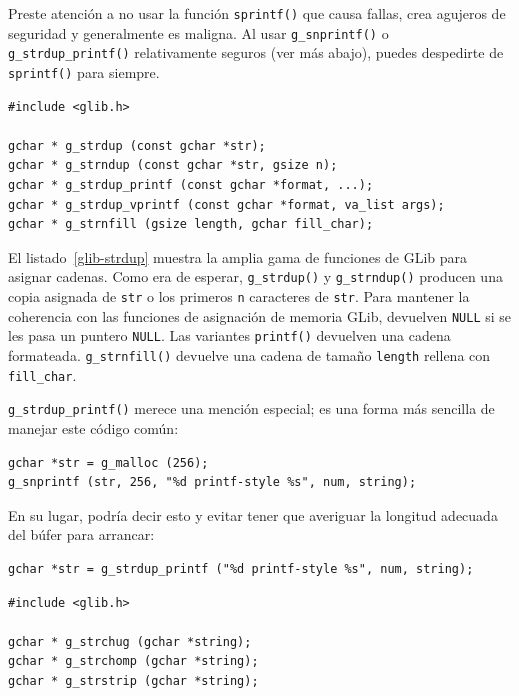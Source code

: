 Preste atención a no usar la función \lstinline{sprintf()} que causa fallas, crea agujeros de seguridad y generalmente es maligna. Al usar \lstinline{g_snprintf()} o \lstinline{g_strdup_printf()} relativamente seguros (ver más abajo), puedes despedirte de \lstinline{sprintf()} para siempre.

\begin{lstlisting}[style=GLib/GTK, caption={Asignar cadenas}, label=glib-strdup]
#include <glib.h>

gchar * g_strdup (const gchar *str);
gchar * g_strndup (const gchar *str, gsize n);
gchar * g_strdup_printf (const gchar *format, ...);
gchar * g_strdup_vprintf (const gchar *format, va_list args);
gchar * g_strnfill (gsize length, gchar fill_char);
\end{lstlisting}

El listado~\ref{glib-strdup} muestra la amplia gama de funciones de GLib para asignar cadenas. Como era de esperar, \lstinline{g_strdup()} y \lstinline{g_strndup()} producen una copia asignada de \lstinline{str} o los primeros \lstinline{n} caracteres de \lstinline{str}. Para mantener la coherencia con las funciones de asignación de memoria GLib, devuelven \lstinline{NULL} si se les pasa un puntero \lstinline{NULL}. Las variantes \lstinline{printf()} devuelven una cadena formateada. \lstinline{g_strnfill()} devuelve una cadena de tamaño \lstinline{length} rellena con \lstinline{fill_char}.

\lstinline{g_strdup_printf()} merece una mención especial; es una forma más sencilla de manejar este código común:
\begin{lstlisting}[style=GLib/GTK,]
gchar *str = g_malloc (256);
g_snprintf (str, 256, "%d printf-style %s", num, string);
\end{lstlisting}

En su lugar, podría decir esto y evitar tener que averiguar la longitud adecuada del búfer para arrancar:
\begin{lstlisting}[style=GLib/GTK,]
gchar *str = g_strdup_printf ("%d printf-style %s", num, string);
\end{lstlisting}

\begin{lstlisting}[style=GLib/GTK, caption={Modificaciones de cadenas in situ}, label=glib-strmanip]
#include <glib.h>

gchar * g_strchug (gchar *string);
gchar * g_strchomp (gchar *string);
gchar * g_strstrip (gchar *string);
\end{lstlisting}

